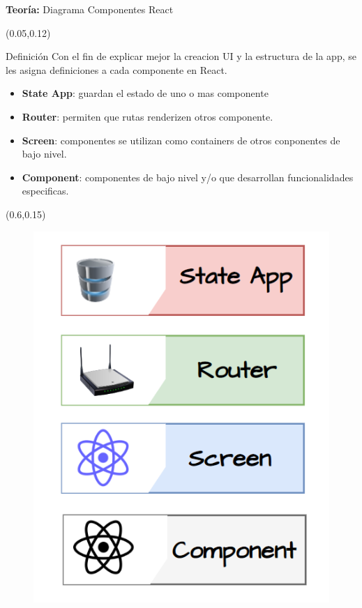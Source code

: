 \documentclass[xcolor=pdftex,dvipsnames,table]{beamer}
\begin{document}
\begin{frame}{\textbf{Teoría:} Diagrama Componentes React}
    \begin{textblock*}{0.58\textwidth}(0.05\textwidth,0.12\textwidth)
            \begin{block}{Definición} 
            \justifying
                Con el fin de explicar mejor la creacion UI y la estructura de la app, se les asigna definiciones a cada componente en React.
                    \vspace{-0.0cm}
                    \begin{itemize}
                        \item {\textbf{State App}: guardan el estado de uno o mas componente}
                        \item { \textbf{Router}: permiten que rutas renderizen otros componente.}
                        \item {\textbf{Screen}: componentes se utilizan como containers de otros conponentes de bajo nivel.}
                        \item {\textbf{Component}: componentes de bajo nivel y/o que desarrollan funcionalidades especificas.}                        
                    \end{itemize}
            \end{block}
    \end{textblock*}
    
    
    \begin{textblock*}{0.5\textwidth}(0.6\textwidth,0.15\textwidth)
        \begin{figure}
            \centering
            \includegraphics[width=0.75\linewidth]{front/nomen.png}
            \label{fig:my_label}
        \end{figure}
    \end{textblock*}
\end{frame}
\end{document}
